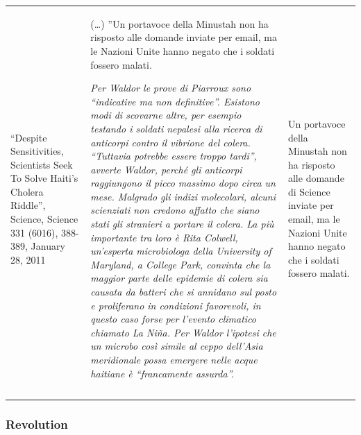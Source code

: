 \documentclass[output=paper]{LSP/langsci}
\begin{document}
\begin{table}
\begin{tabularx}{\textwidth}{Q  p{5cm} p{3cm}}
 ``Despite Sensitivities, Scientists Seek To Solve Haiti's Cholera Riddle'', Science, Science 331 (6016), 388-389, January 28, 2011 &
 
\raggedright 
 (\ldots ) ''Un portavoce della Minustah non ha risposto alle domande inviate per email, ma le Nazioni Unite hanno negato che i soldati fossero malati.

{\itshape Per Waldor le prove di Piarroux sono ``indicative ma non definitive''. Esistono modi di scovarne altre, per esempio testando i soldati nepalesi alla ricerca di anticorpi contro il vibrione del colera. ``Tuttavia potrebbe essere troppo tardi'', avverte Waldor, perché gli anticorpi raggiungono il picco massimo dopo circa un mese.
Malgrado gli indizi molecolari, alcuni scienziati non credono affatto che siano stati gli stranieri a portare il colera. La più importante tra loro è Rita Colwell, un'esperta microbiologa della University of Maryland, a College Park, convinta che la maggior parte delle epidemie di colera sia causata da batteri che si annidano sul posto e proliferano in condizioni favorevoli, in questo caso forse per l'evento climatico chiamato La Niña. Per Waldor l'ipotesi che un microbo così simile al ceppo dell'Asia meridionale possa emergere nelle acque haitiane è ``francamente assurda''.} & 

{\raggedright
Un portavoce della Minustah non ha risposto alle domande di Science inviate per email, ma le Nazioni Unite hanno negato
che i soldati fossero malati.} \\
\\
\lspbottomrule
\end{tabularx}
\end{table}

\subsubsection{Revolution}
\end{document}
